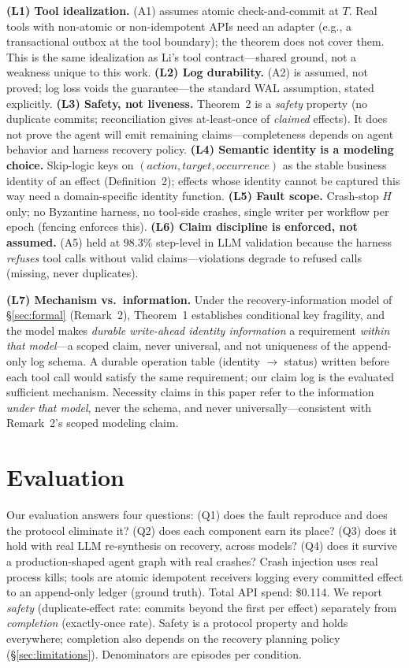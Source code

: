 \documentclass[10pt,journal,compsoc]{IEEEtran}
\begin{document}
\textbf{(L1) Tool idealization.} (A1) assumes atomic
check-and-commit at $T$. Real tools with non-atomic or
non-idempotent APIs need an adapter (e.g., a transactional
outbox at the tool boundary); the theorem does not cover them.
This is the same idealization as Li's tool contract---shared
ground, not a weakness unique to this work. \textbf{(L2) Log
durability.} (A2) is assumed, not proved; log loss voids the
guarantee---the standard WAL assumption, stated explicitly.
\textbf{(L3) Safety, not liveness.} Theorem~2 is a \emph{safety}
property (no duplicate commits; reconciliation gives
at-least-once of \emph{claimed} effects). It does not prove the
agent will emit remaining claims---completeness depends on agent
behavior and harness recovery policy. \textbf{(L4) Semantic identity is a modeling choice.} Skip-logic keys on
$(\mathit{action}, \mathit{target}, \mathit{occurrence})$ as the stable business
identity of an effect (Definition~2); effects whose identity cannot be captured
this way need a domain-specific identity function.
\textbf{(L5) Fault scope.} Crash-stop $H$ only; no Byzantine
harness, no tool-side crashes, single writer per workflow per
epoch (fencing enforces this). \textbf{(L6) Claim discipline is
enforced, not assumed.} (A5) held at 98.3\% step-level in LLM
validation because the harness \emph{refuses} tool calls without
valid claims---violations degrade to refused calls (missing,
never duplicates).

\textbf{(L7) Mechanism vs.\ information.} Under the
recovery-information model of \S\ref{sec:formal} (Remark~2),
Theorem~1 establishes conditional key fragility, and the model
makes \emph{durable write-ahead identity information} a
requirement \emph{within that model}---a scoped claim, never
universal, and not uniqueness of the append-only log schema. A durable operation table (identity
$\to$ status) written before each tool call would satisfy the
same requirement; our claim log is the evaluated sufficient
mechanism. Necessity claims in this paper refer to the
information \emph{under that model}, never the schema, and
never universally---consistent with Remark~2's scoped modeling
claim.

\section{Evaluation}
\label{sec:eval}

Our evaluation answers four questions: (Q1) does the fault
reproduce and does the protocol eliminate it? (Q2) does each
component earn its place? (Q3) does it hold with real LLM
re-synthesis on recovery, across models? (Q4) does it survive
a production-shaped agent graph with real crashes? Crash
injection uses real process kills; tools are atomic idempotent
receivers logging every committed effect to an append-only
ledger (ground truth). Total API spend: \$0.114. We report
\emph{safety} (duplicate-effect rate: commits beyond the first
per effect) separately from \emph{completion} (exactly-once
rate). Safety is a protocol property and holds everywhere;
completion also depends on the recovery planning policy
(\S\ref{sec:limitations}). Denominators are episodes per
condition.
\end{document}
